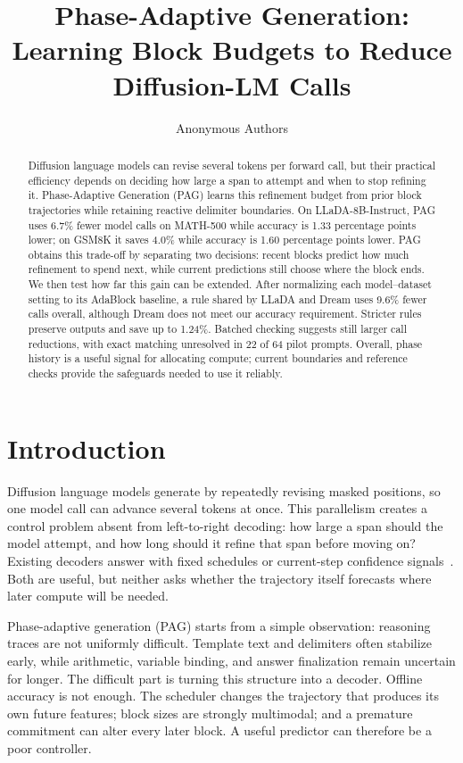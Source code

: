 \documentclass{article}
\title{Phase-Adaptive Generation:\\Learning Block Budgets to Reduce Diffusion-LM Calls}
\author{Anonymous Authors}
\newcommand{\pag}{PAG}
\begin{document}
\raggedbottom

\maketitle

\begin{abstract}
Diffusion language models can revise several tokens per forward call, but their practical efficiency depends on deciding how large a span to attempt and when to stop refining it. Phase-Adaptive Generation (PAG) learns this refinement budget from prior block trajectories while retaining reactive delimiter boundaries. On LLaDA-8B-Instruct, PAG uses 6.7\% fewer model calls on MATH-500 while accuracy is 1.33 percentage points lower; on GSM8K it saves 4.0\% while accuracy is 1.60 percentage points lower. PAG obtains this trade-off by separating two decisions: recent blocks predict how much refinement to spend next, while current predictions still choose where the block ends. We then test how far this gain can be extended. After normalizing each model--dataset setting to its AdaBlock baseline, a rule shared by LLaDA and Dream uses 9.6\% fewer calls overall, although Dream does not meet our accuracy requirement. Stricter rules preserve outputs and save up to 1.24\%. Batched checking suggests still larger call reductions, with exact matching unresolved in 22 of 64 pilot prompts. Overall, phase history is a useful signal for allocating compute; current boundaries and reference checks provide the safeguards needed to use it reliably.
\end{abstract}

\section{Introduction}
\label{sec:introduction}

Diffusion language models generate by repeatedly revising masked positions, so one model call can advance several tokens at once. This parallelism creates a control problem absent from left-to-right decoding: how large a span should the model attempt, and how long should it refine that span before moving on? Existing decoders answer with fixed schedules or current-step confidence signals~\citep{wu2025fastdllm,lu2026adablock,mohamed2025sched}. Both are useful, but neither asks whether the trajectory itself forecasts where later compute will be needed.

Phase-adaptive generation (\pag{}) starts from a simple observation: reasoning traces are not uniformly difficult. Template text and delimiters often stabilize early, while arithmetic, variable binding, and answer finalization remain uncertain for longer. The difficult part is turning this structure into a decoder. Offline accuracy is not enough. The scheduler changes the trajectory that produces its own future features; block sizes are strongly multimodal; and a premature commitment can alter every later block. A useful predictor can therefore be a poor controller.
\end{document}

